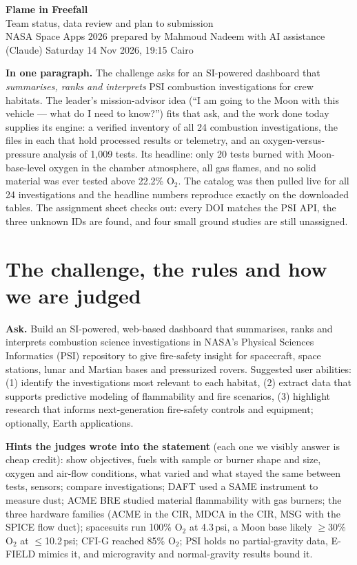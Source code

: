 \documentclass[10pt,a4paper]{article}
\newcommand{\keybox}[1]{\par\noindent\colorbox{soft}{\parbox{\dimexpr\linewidth-2\fboxsep}{#1}}\par}
\begin{document}
\begin{center}
{\LARGE\bfseries Flame in Freefall}\\[0.3em]
{\large Team status, data review and plan to submission}\\[0.4em]
{\small NASA Space Apps 2026 \textbullet{} prepared by Mahmoud Nadeem with AI assistance (Claude) \textbullet{} Saturday 14 Nov 2026, 19:15 Cairo}
\end{center}

\keybox{\textbf{In one paragraph.} The challenge asks for an SI-powered dashboard that \emph{summarises, ranks and interprets} PSI combustion investigations for crew habitats. The leader's mission-advisor idea (``I am going to the Moon with this vehicle --- what do I need to know?'') fits that ask, and the work done today supplies its engine: a verified inventory of all 24 combustion investigations, the files in each that hold processed results or telemetry, and an oxygen-versus-pressure analysis of 1,009 tests. Its headline: only 20 tests burned with Moon-base-level oxygen in the chamber atmosphere, all gas flames, and no solid material was ever tested above 22.2\% O$_2$. The catalog was then pulled live for all 24 investigations and the headline numbers reproduce exactly on the downloaded tables. The assignment sheet checks out: every DOI matches the PSI API, the three unknown IDs are found, and four small ground studies are still unassigned.}


\section{The challenge, the rules and how we are judged}

\textbf{Ask.} Build an SI-powered, web-based dashboard that summarises, ranks and interprets combustion science investigations in NASA's Physical Sciences Informatics (PSI) repository to give fire-safety insight for spacecraft, space stations, lunar and Martian bases and pressurized rovers. Suggested user abilities: (1) identify the investigations most relevant to each habitat, (2) extract data that supports predictive modeling of flammability and fire scenarios, (3) highlight research that informs next-generation fire-safety controls and equipment; optionally, Earth applications.

\textbf{Hints the judges wrote into the statement} (each one we visibly answer is cheap credit): show objectives, fuels with sample or burner shape and size, oxygen and air-flow conditions, what varied and what stayed the same between tests, sensors; compare investigations; DAFT used a SAME instrument to measure dust; ACME BRE studied material flammability with gas burners; the three hardware families (ACME in the CIR, MDCA in the CIR, MSG with the SPICE flow duct); spacesuits run 100\% O$_2$ at 4.3\,psi, a Moon base likely $\geq$30\% O$_2$ at $\leq$10.2\,psi; CFI-G reached 85\% O$_2$; PSI holds no partial-gravity data, E-FIELD mimics it, and microgravity and normal-gravity results bound it.
\end{document}

